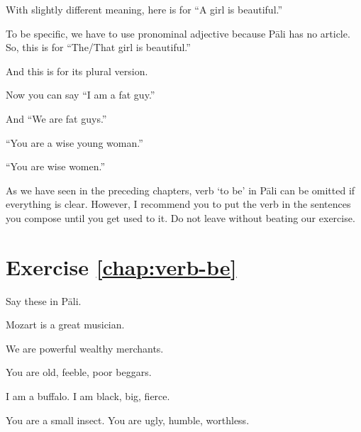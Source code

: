 
With slightly different meaning, here is for ``A girl is beautiful.''


To be specific, we have to use pronominal adjective  because P\=ali has no article. So, this is for ``The/That girl is beautiful.''


And this is for its plural version.


Now you can say ``I am a fat guy.''


And ``We are fat guys.''


``You are a wise young woman.''


``You are wise women.''


As we have seen in the preceding chapters, verb `to be' in P\=ali can be omitted if everything is clear. However, I recommend you to put the verb in the sentences you compose until you get used to it. Do not leave without beating our exercise.

\section*{Exercise \ref{chap:verb-be}}
Say these in P\=ali.
\begin{compactenum}
\item Mozart is a great musician.
\item We are powerful wealthy merchants.
\item You are old, feeble, poor beggars.
\item I am a buffalo. I am black, big, fierce.
\item You are a small insect. You are ugly, humble, worthless.
\end{compactenum}
